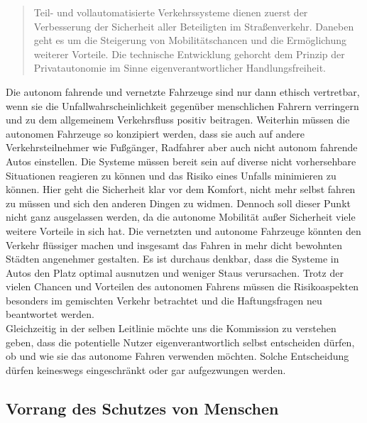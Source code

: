\documentclass[twoside,a4paper,12pt]{article}
\begin{document}
\begin{quote}
\glqq
Teil- und vollautomatisierte Verkehrssysteme dienen zuerst der Verbesserung der Sicherheit aller Beteiligten im Straßenverkehr. 
Daneben geht es um die Steigerung von Mobilitätschancen und die Ermöglichung weiterer Vorteile. Die technische Entwicklung 
gehorcht dem Prinzip der Privatautonomie im Sinne eigenverantwortlicher Handlungsfreiheit.\grqq\mbox{~\cite[S. 10]{ek}}
\end{quote}
Die autonom fahrende und vernetzte Fahrzeuge sind nur dann ethisch vertretbar, wenn sie die Unfallwahrscheinlichkeit gegenüber menschlichen Fahrern verringern und zu dem allgemeinem Verkehrsfluss positiv beitragen. Weiterhin müssen die autonomen Fahrzeuge so konzipiert werden, dass sie auch auf andere Verkehrsteilnehmer wie Fußgänger, Radfahrer aber auch nicht autonom fahrende Autos  einstellen. Die Systeme müssen bereit sein auf diverse nicht vorhersehbare Situationen reagieren zu können und das Risiko eines Unfalls minimieren zu können. Hier geht die Sicherheit klar vor dem Komfort, nicht mehr selbst fahren zu müssen und sich den anderen Dingen zu widmen. Dennoch soll dieser Punkt nicht ganz ausgelassen werden, da die autonome Mobilität außer Sicherheit viele weitere Vorteile in sich hat. Die vernetzten und autonome Fahrzeuge könnten den Verkehr flüssiger machen und insgesamt das Fahren in mehr dicht bewohnten Städten angenehmer gestalten. Es ist durchaus denkbar, dass die Systeme in Autos den Platz optimal ausnutzen und weniger Staus verursachen. Trotz der vielen Chancen und Vorteilen des autonomen Fahrens müssen die Risikoaspekten besonders im gemischten Verkehr betrachtet  und die Haftungsfragen neu beantwortet werden. \\  Gleichzeitig in der selben Leitlinie möchte uns die Kommission zu verstehen geben, dass die potentielle Nutzer eigenverantwortlich selbst entscheiden dürfen, ob und wie sie das autonome Fahren verwenden möchten. Solche Entscheidung dürfen keineswegs eingeschränkt oder gar aufgezwungen werden.

\subsection{Vorrang des Schutzes von Menschen} \label{VorrangDesSchutzesVonMenschen}
\end{document}
